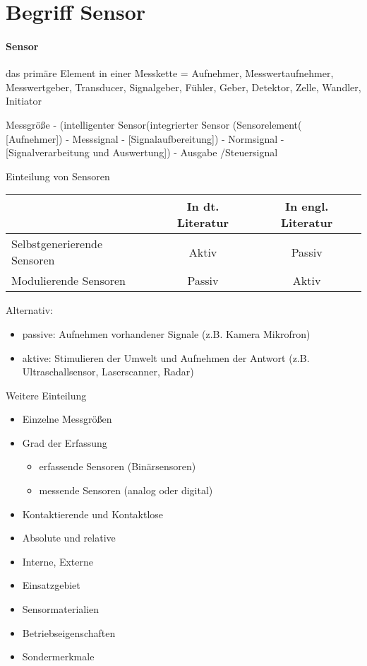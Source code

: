 \documentclass[a4paper]{scrartcl}
\begin{document}
\section{Begriff Sensor}
\paragraph{Sensor} das primäre Element in einer Messkette = Aufnehmer, Messwertaufnehmer, Messwertgeber, Transducer, Signalgeber, Fühler, Geber, Detektor, Zelle, Wandler, Initiator

Messgröße - (intelligenter Sensor(integrierter Sensor (Sensorelement( [Aufnehmer]) - Messsignal - [Signalaufbereitung]) - Normsignal - [Signalverarbeitung und Auswertung]) - Ausgabe /Steuersignal

Einteilung von Sensoren

\begin{tabular}{l|c|c}
 & In dt. Literatur & In engl. Literatur \\ \hline
Selbstgenerierende Sensoren & Aktiv & Passiv\\
Modulierende Sensoren & Passiv & Aktiv \\
\end{tabular}

Alternativ:
\begin{itemize}
    \item passive: Aufnehmen vorhandener Signale (z.B. Kamera Mikrofron)
    \item aktive: Stimulieren der Umwelt und Aufnehmen der Antwort (z.B. Ultraschallsensor, Laserscanner, Radar)
\end{itemize}

Weitere Einteilung

\begin{itemize}
\item Einzelne Messgrößen
\item Grad der Erfassung 
    \begin{itemize}
    \item erfassende Sensoren (Binärsensoren)
    \item messende Sensoren (analog oder digital)
    \end{itemize}
\item Kontaktierende und Kontaktlose
\item Absolute und relative
\item Interne, Externe
\item Einsatzgebiet
\item Sensormaterialien
\item Betriebseigenschaften
\item Sondermerkmale
\end{itemize}
\end{document}
